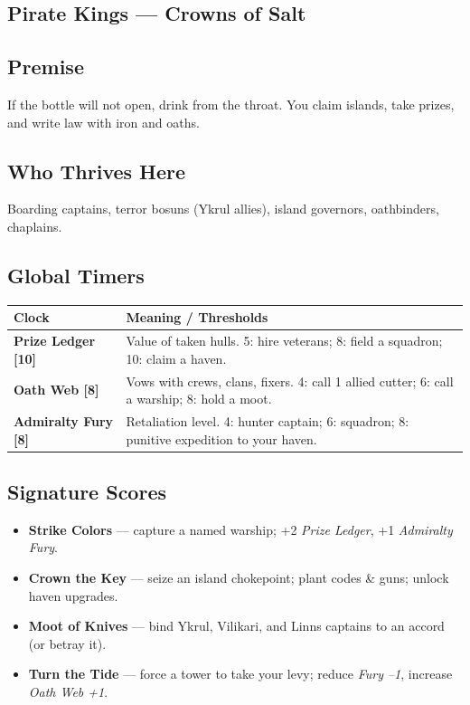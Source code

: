 \documentclass[11pt,oneside]{book}
\begin{document}
\begin{itemize}
\section{\textbf{Pirate Kings} --- Crowns of Salt}

\subsection*{Premise}
If the bottle will not open, drink from the throat. You claim islands, take prizes, and write law with iron and oaths.

\subsection*{Who Thrives Here}
Boarding captains, terror bosuns (Ykrul allies), island governors, oathbinders, chaplains.

\subsection*{Global Timers}
\begin{tabularx}{\linewidth}{@{}p{3.6cm} X@{}}
\toprule
\textbf{Clock} & \textbf{Meaning / Thresholds}\\
\midrule
\textbf{Prize Ledger [10]} & Value of taken hulls. 5: hire veterans; 8: field a squadron; 10: claim a haven.\\
\textbf{Oath Web [8]} & Vows with crews, clans, fixers. 4: call 1 allied cutter; 6: call a warship; 8: hold a moot.\\
\textbf{Admiralty Fury [8]} & Retaliation level. 4: hunter captain; 6: squadron; 8: punitive expedition to your haven.\\
\bottomrule
\end{tabularx}

\subsection*{Signature Scores}
\begin{itemize}[leftmargin=*,itemsep=2pt]
  \item \textbf{Strike Colors} --- capture a named warship; +2 \emph{Prize Ledger}, +1 \emph{Admiralty Fury}.
  \item \textbf{Crown the Key} --- seize an island chokepoint; plant codes & guns; unlock haven upgrades.
  \item \textbf{Moot of Knives} --- bind Ykrul, Vilikari, and Linns captains to an accord (or betray it).
  \item \textbf{Turn the Tide} --- force a tower to take your levy; reduce \emph{Fury --1}, increase \emph{Oath Web +1}.
\end{itemize}


\end{itemize}
\end{document}
